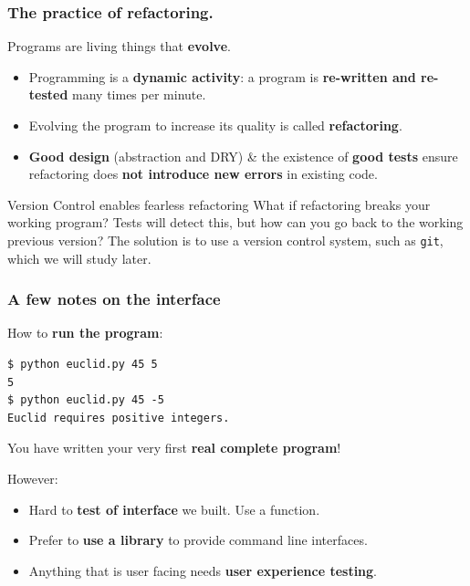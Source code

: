 \documentclass{beamer} %
\newcommand\emc[1]{\textcolor{midred}{\textbf{#1}}}
\begin{document}
\begin{frame}
\frametitle{The practice of refactoring.}

Programs are living things that \emc{evolve}.
\begin{itemize}
\item Programming is a \emc{dynamic activity}: a program is \emc{re-written and re-tested} many times per minute.
\item Evolving the program to increase its quality is called \emc{refactoring}.
\item \emc{Good design} (abstraction and DRY) \& the existence of \emc{good tests} ensure refactoring does \emc{not introduce new errors} in existing code.
\end{itemize}

\begin{block}{Version Control enables fearless refactoring}
What if refactoring breaks your working program? Tests will detect this, but how can you go back to the working previous version? The solution is to use a version control system, such as \texttt{git}, which we will study later.
\end{block}

\end{frame}


\begin{frame}[fragile]
\frametitle{A few notes on the interface}

How to \emc{run the program}:
\begin{center}
\begin{Verbatim}[fontsize=\scriptsize]
$ python euclid.py 45 5
5
$ python euclid.py 45 -5
Euclid requires positive integers.
\end{Verbatim}
\end{center}
You have written your very first \emc{real complete program}!

\vspace{3mm}
However:
\begin{itemize}
	\item Hard to \emc{test of interface} we built. Use a function.
	\item Prefer to \emc{use a library} to provide command line interfaces.
	\item Anything that is user facing needs \emc{user experience testing}.
\end{itemize}

\end{frame}


\end{document}

